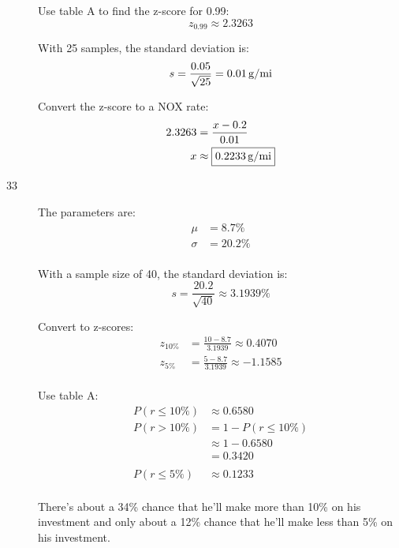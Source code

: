 \documentclass[letterpaper]{exam}
\begin{document}
\begin{description}
        Use table A to find the z-score for 0.99:
        \[
          z_{0.99} \approx 2.3263
        \]

        With 25 samples, the standard deviation is:
        \[
          s = \frac{0.05}{\sqrt{25}} = \unit[0.01]{g/mi}
        \]

        Convert the z-score to a NOX rate:
        \begin{align*}
          2.3263 & = \frac{x - 0.2}{0.01} \\
          x     & \approx \boxed{ \unit[0.2233]{g/mi} } \\
        \end{align*}

      \item[33]
        The parameters are:
        \begin{align*}
          \mu    & = 8.7\% \\
          \sigma & = 20.2\% \\
        \end{align*}

        With a sample size of 40, the standard deviation is:
        \[
          s = \frac{20.2}{\sqrt{40}} \approx 3.1939\%
        \]

        Convert to z-scores:
        \begin{align*}
          z_{10\%} & = \frac{10 - 8.7}{3.1939} \approx 0.4070 \\
          z_{5\%}  & = \frac{5 - 8.7}{3.1939} \approx -1.1585 \\
        \end{align*}

        Use table A:\@
        \begin{align*}
          P(r \leq 10\%) & \approx \boxed{ 0.6580 } \\
          P(r > 10\%)    & = 1 - P(r \leq 10\%) \\
                         & \approx 1 - 0.6580 \\
                         & = \boxed{ 0.3420 } \\
          \\
          P(r \leq 5\%)  & \approx \boxed{ 0.1233 } \\
        \end{align*}

        There's about a 34\% chance that he'll make more than 10\% on his
        investment and only about a 12\% chance that he'll make less than 5\% on
        his investment.


\end{description}
\end{document}
